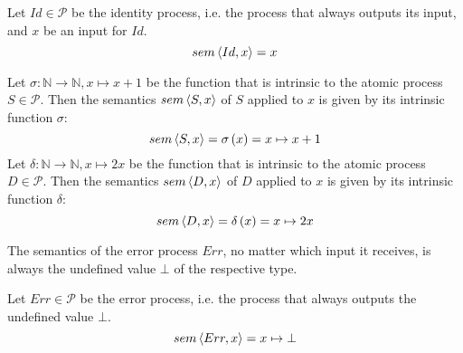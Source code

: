 

\begin{definition}
\label{def:sem_id}
Let $Id \in \mathcal{P}$ be the identity process, i.e. the process that always outputs its input, and $x$ be an input for $Id$.
\begin{equation}
  \label{eqn:sem_id}
  sem \left\langle Id, x \right\rangle = x
\end{equation}
\hfill\qedsymbol
\end{definition}


\begin{example}
  \label{exp:sem_atomic}
  Let $\sigma \colon \mathbb{N} \to \mathbb{N}, x \mapsto x+1$ be the function that is intrinsic to the atomic process $S \in \mathcal{P}$. Then the semantics $sem \left\langle S, x \right\rangle$ of $S$ applied to $x$ is given by its intrinsic function $\sigma$:
  \begin{equation}
    sem \left\langle S, x \right\rangle = \sigma \left( x \right) = x \mapsto x+1
  \end{equation}
  Let $\delta \colon \mathbb{N} \to \mathbb{N}, x \mapsto 2x$ be the function that is intrinsic to the atomic process $D \in \mathcal{P}$. Then the semantics $sem \left\langle D, x \right\rangle$ of $D$ applied to $x$ is given by its intrinsic function $\delta$:
  \begin{equation}
    sem \left\langle D, x \right\rangle = \delta \left( x \right) = x \mapsto 2x
  \end{equation}
  \hfill\qedsymbol
\end{example}


The semantics of the error process $Err$, no matter which input it receives, is always the undefined value $\bot$ of the respective type. 
\begin{definition}
\label{def:sem_err}
Let $Err \in \mathcal{P}$ be the error process, i.e. the process that always outputs the undefined value $\bot$.
  \begin{equation}
    \label{eqn:sem_error}
    sem \left\langle Err, x \right\rangle = x \mapsto \bot
  \end{equation}
  \hfill\qedsymbol
\end{definition}

